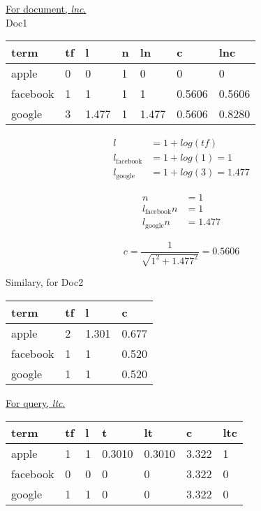 \documentclass[11pt,a4paper]{report}
\begin{document}
\begin{multicols*}{2}
\noindent \underline{For document, \textit{lnc}.}\\

\noindent Doc1

\begin{center}
\begin{tabular}{| l | l | l | l | l | l | l|}
    \hline
    term     & tf & l & n & ln & c & lnc\\
    \hline
    apple    & 0 & 0 & 1 & 0 & 0 & 0\\
    facebook & 1 & 1 & 1 & 1 & 0.5606 & 0.5606\\
    google   & 3 & 1.477 & 1 & 1.477 & 0.5606 & 0.8280\\
    \hline
\end{tabular}
\end{center}

\begin{equation*}
\begin{split}
l                   &= 1 + log(tf)\\
l_{\text{facebook}} &= 1 + log(1) = 1\\
l_{\text{google}}   &= 1 + log(3) = 1.477
\end{split}
\end{equation*}

\begin{equation*}
\begin{split}
n &= 1 \\
l_{\text{facebook}} n &= 1 \\
l_{\text{google}}n &= 1.477
\end{split}
\end{equation*}

$$c = \frac{1}{\sqrt{1^2 + 1.477^2}} = 0.5606$$

\noindent Similary, for Doc2

\begin{center}
\begin{tabular}{|l | l | l | l |}
    \hline
    term     & tf & l & c \\
    \hline
    apple    & 2 & 1.301 & 0.677 \\
    facebook & 1 & 1 & 0.520\\
    google   & 1 & 1 & 0.520\\
    \hline
\end{tabular}
\end{center}

\noindent \underline{For query, \textit{ltc}.}
\begin{center}
\begin{tabular}{|l | l | l | l | l | l |l |}
    \hline
    term     & tf & l & t & lt & c & ltc\\
    \hline
    apple    & 1 & 1 & 0.3010 & 0.3010 & 3.322 & 1\\
    facebook & 0 & 0 & 0 & 0 & 3.322 & 0\\
    google   & 1 & 1 & 0 & 0 & 3.322 & 0\\
    \hline
\end{tabular}
\end{center}


\end{multicols*}
\end{document}
